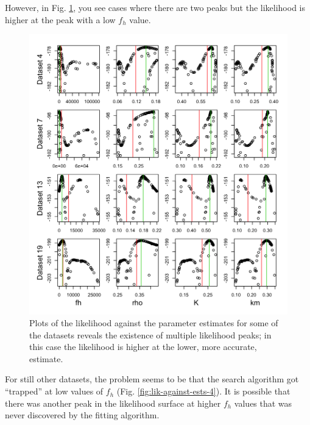 \documentclass[12pt,reqno,final,pdftex]{amsart}\usepackage[]{graphicx}\usepackage[]{color}
\newenvironment{knitrout}{}{} %
\theoremstyle{plain}
\numberwithin{equation}{part}
\begin{document}
However, in Fig. \ref{fig:lik-against-ests-3}, you see cases where there are two peaks but the likelihood is higher at the peak with a low $f_h$ value.

\begin{knitrout}\scriptsize
{}\color{fgcolor}\begin{figure}

\includegraphics[width=\linewidth]{figure/lik-against-ests-3-1} \hfill{}

\caption[Plots of the likelihood against the parameter estimates for some of the datasets reveals the existence of multiple likelihood peaks]{Plots of the likelihood against the parameter estimates for some of the datasets reveals the existence of multiple likelihood peaks; in this case the likelihood is higher at the lower, more accurate, estimate.}\label{fig:lik-against-ests-3}
\end{figure}


\end{knitrout}

For still other datasets, the problem seems to be that the search algorithm got ``trapped'' at low values of $f_h$ (Fig. \ref{fig:lik-against-ests-4}).
It is possible that there was another peak in the likelihood surface at higher $f_h$ values that was never discovered by the fitting algorithm.
\end{document}
